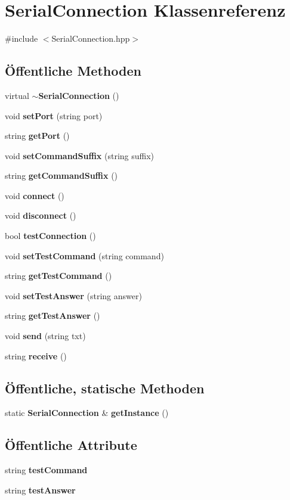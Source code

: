 \section{Serial\+Connection Klassenreferenz}
\label{class_serial_connection}


{\ttfamily \#include $<$Serial\+Connection.\+hpp$>$}

\subsection*{Öffentliche Methoden}
\begin{DoxyCompactItemize}
\item 
virtual \textbf{ $\sim$\+Serial\+Connection} ()
\item 
void \textbf{ set\+Port} (string port)
\item 
string \textbf{ get\+Port} ()
\item 
void \textbf{ set\+Command\+Suffix} (string suffix)
\item 
string \textbf{ get\+Command\+Suffix} ()
\item 
void \textbf{ connect} ()
\item 
void \textbf{ disconnect} ()
\item 
bool \textbf{ test\+Connection} ()
\item 
void \textbf{ set\+Test\+Command} (string command)
\item 
string \textbf{ get\+Test\+Command} ()
\item 
void \textbf{ set\+Test\+Answer} (string answer)
\item 
string \textbf{ get\+Test\+Answer} ()
\item 
void \textbf{ send} (string txt)
\item 
string \textbf{ receive} ()
\end{DoxyCompactItemize}
\subsection*{Öffentliche, statische Methoden}
\begin{DoxyCompactItemize}
\item 
static \textbf{ Serial\+Connection} \& \textbf{ get\+Instance} ()
\end{DoxyCompactItemize}
\subsection*{Öffentliche Attribute}
\begin{DoxyCompactItemize}
\item 
string \textbf{ test\+Command}
\item 
string \textbf{ test\+Answer}
\end{DoxyCompactItemize}


